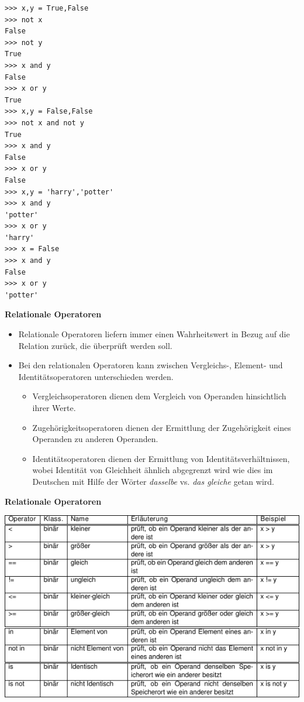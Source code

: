 \begin{verbatim}
>>> x,y = True,False
>>> not x
False
>>> not y
True
>>> x and y
False
>>> x or y
True
>>> x,y = False,False
>>> not x and not y
True
>>> x and y
False
>>> x or y
False
>>> x,y = 'harry','potter'
>>> x and y
'potter'
>>> x or y
'harry'
>>> x = False
>>> x and y
False
>>> x or y
'potter'
\end{verbatim}




\vspace{0.5cm}\par\noindent\textbf{Relationale Operatoren}\vspace{0.5cm}

\begin{itemize}
\itemsep1pt\parskip0pt
\item
  {Relationale Operatoren liefern immer einen Wahrheitswert in Bezug auf
  die Relation zurück, die überprüft werden soll.}
\item
  {Bei den relationalen Operatoren kann zwischen Vergleichs-, Element-
  und Identitätsoperatoren unterschieden werden.}

  \begin{itemize}
  \itemsep1pt\parskip0pt
  \item
    {Vergleichsoperatoren dienen dem Vergleich von Operanden
    hinsichtlich ihrer Werte.}
  \item
    {Zugehörigkeitsoperatoren dienen der Ermittlung der Zugehörigkeit
    eines Operanden zu anderen Operanden.}
  \item
    {Identitätsoperatoren dienen der Ermittlung von
    Identitätsverhältnissen, wobei Identität von Gleichheit ähnlich
    abgegrenzt wird wie dies im Deutschen mit Hilfe der Wörter
    \emph{dasselbe} vs. \emph{das gleiche} getan wird.}
  \end{itemize}
\end{itemize}




\vspace{0.5cm}\par\noindent\textbf{Relationale Operatoren}\vspace{0.5cm}

\includegraphics[width=\textwidth]{img/relationale_operatoren.pdf}




